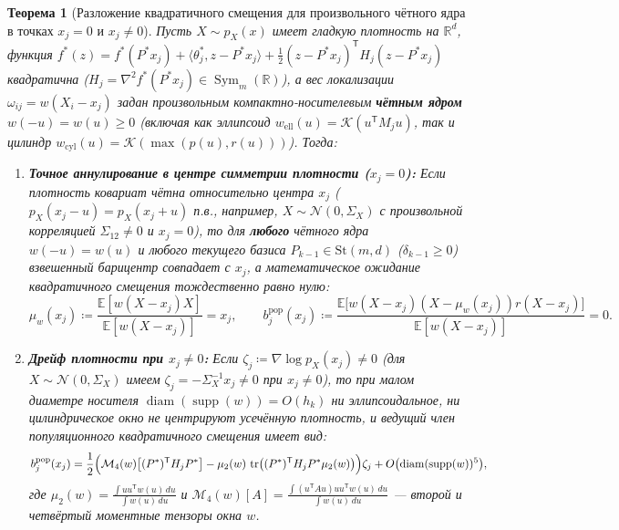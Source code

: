 \documentclass[11pt,a4paper]{article}
\newcommand{\R}{\mathbb{R}}
\newcommand{\E}{\mathbb{E}}
\newcommand{\T}{^{\mathsf{T}}}
\newcommand{\St}{\mathrm{St}}
\newcommand{\Kern}{\mathcal{K}}
\newcommand{\PEDRs}{P^{*}}
\DeclareMathOperator{\tr}{tr}
\DeclareMathOperator{\supp}{supp}
\newtheorem{theorem}{Теорема}[section]
\theoremstyle{definition}
\theoremstyle{remark}
\begin{document}
\begin{theorem}[Разложение квадратичного смещения для произвольного чётного ядра в точках $x_j = 0$ и $x_j \neq 0$]\label{thm:moment_expansion_symmetric}
Пусть $X \sim p_X(x)$ имеет гладкую плотность на $\R^d$, функция $f^*(z) = f^*(\PEDRs x_j) + \langle \theta^*_j, z - \PEDRs x_j\rangle + \frac{1}{2}(z - \PEDRs x_j)\T H_j (z - \PEDRs x_j)$ квадратична ($H_j = \nabla^2 f^*(\PEDRs x_j) \in \operatorname{Sym}_m(\R)$), а вес локализации $\omega_{ij} = w(X_i - x_j)$ задан произвольным компактно-носителевым \textbf{чётным ядром} $w(-u) = w(u) \ge 0$ (включая как эллипсоид $w_{\mathrm{ell}}(u) = \Kern(u\T M_j u)$, так и цилиндр $w_{\mathrm{cyl}}(u) = \Kern(\max(p(u), r(u)))$). Тогда:
\begin{enumerate}
    \item \textbf{Точное аннулирование в центре симметрии плотности ($x_j = 0$):} Если плотность ковариат чётна относительно центра $x_j$ ($p_X(x_j - u) = p_X(x_j + u)$ п.в., например, $X \sim \mathcal{N}(0, \Sigma_X)$ с произвольной корреляцией $\Sigma_{12} \neq 0$ и $x_j = 0$), то для \textbf{любого} чётного ядра $w(-u) = w(u)$ и любого текущего базиса $P_{k-1} \in \St(m,d)$ ($\delta_{k-1} \ge 0$) взвешенный барицентр совпадает с $x_j$, а математическое ожидание квадратичного смещения тождественно равно нулю:
    \begin{equation}\label{eq:even_kernel_zero_bias}
        \mu_w(x_j) \coloneqq \frac{\E[w(X - x_j) X]}{\E[w(X - x_j)]} = x_j, \qquad b_j^{\mathrm{pop}}(x_j) \coloneqq \frac{\E\bigl[w(X - x_j)(X - \mu_w(x_j)) r(X - x_j)\bigr]}{\E[w(X - x_j)]} = 0.
    \end{equation}
    \item \textbf{Дрейф плотности при $x_j \neq 0$:} Если $\zeta_j \coloneqq \nabla \log p_X(x_j) \neq 0$ (для $X \sim \mathcal{N}(0, \Sigma_X)$ имеем $\zeta_j = -\Sigma_X^{-1} x_j \neq 0$ при $x_j \neq 0$), то при малом диаметре носителя $\operatorname{diam}(\supp(w)) = O(h_k)$ ни эллипсоидальное, ни цилиндрическое окно не центрируют усечённую плотность, и ведущий член популяционного квадратичного смещения имеет вид:
    \begin{equation}\label{eq:nonzero_center_drift_bias}
        b_j^{\mathrm{pop}}(x_j) = \frac{1}{2}\Bigl(\mathcal{M}_4(w)\bigl[(\PEDRs)\T H_j \PEDRs\bigr] - \mu_2(w)\,\tr\bigl((\PEDRs)\T H_j \PEDRs \mu_2(w)\bigr)\Bigr)\zeta_j + O\bigl(\operatorname{diam}(\supp(w))^5\bigr),
    \end{equation}
    где $\mu_2(w) = \frac{\int u u\T w(u)\,du}{\int w(u)\,du}$ и $\mathcal{M}_4(w)[A] = \frac{\int (u\T A u) u u\T w(u)\,du}{\int w(u)\,du}$ --- второй и четвёртый моментные тензоры окна $w$.
\end{enumerate}
\end{theorem}
\end{document}

